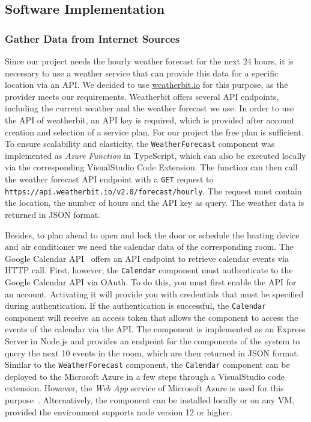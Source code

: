 \documentclass[runningheads]{llncs}
\begin{document}
\subsection{Software Implementation}
\label{imp:soft_imp}

\subsubsection{Gather Data from Internet Sources}\hfill
\label{soft_imp:sensor}
\newline
Since our project needs the hourly weather forecast for the next 24 hours, it is necessary to use a weather service that can provide this data for a specific location via an API.
We decided to use \url{weatherbit.io} for this purpose, as the provider meets our requirements.
Weatherbit offers several API endpoints, including the current weather and the weather forecast we use.
In order to use the API of weatherbit, an API key is required, which is provided after account creation and selection of a service plan.
For our project the free plan is sufficient.
To ensure scalability and elasticity, the \texttt{WeatherForecast} component was implemented as \textit{Azure Function} in TypeScript, which can also be executed locally via the corresponding VisualStudio Code Extension.
The function can then call the weather forecast API endpoint with a \texttt{GET} request to \texttt{https://api.weatherbit.io/v2.0/forecast/hourly}.
The request must contain the location, the number of hours and the API key as query.
The weather data is returned in JSON format.

Besides, to plan ahead to open and lock the door or schedule the heating device and air conditioner we need the calendar data of the corresponding room. 
The Google Calendar API~\cite{APIRefer59:online} offers an API endpoint to retrieve calendar events via HTTP call.
First, however, the \texttt{Calendar} component must authenticate to the Google Calendar API via OAuth.
To do this, you must first enable the API for an account.
Activating it will provide you with credentials that must be specified during authentication.
If the authentication is successful, the \texttt{Calendar} component will receive an access token that allows the component to access the events of the calendar via the API. 
The component is implemented as an Express Server in Node.js and provides an endpoint for the components of the system to query the next 10 events in the room, which are then returned in JSON format.
Similar to the \texttt{WeatherForecast} component, the \texttt{Calendar} component can be deployed to the Microsoft Azure in a few steps through a VisualStudio code extension.
However, the \textit{Web App} service of Microsoft Azure is used for this purpose~\cite{WebAppDi86:online}.
Alternatively, the component can be installed locally or on any VM, provided the environment supports node version 12 or higher.
\end{document}
